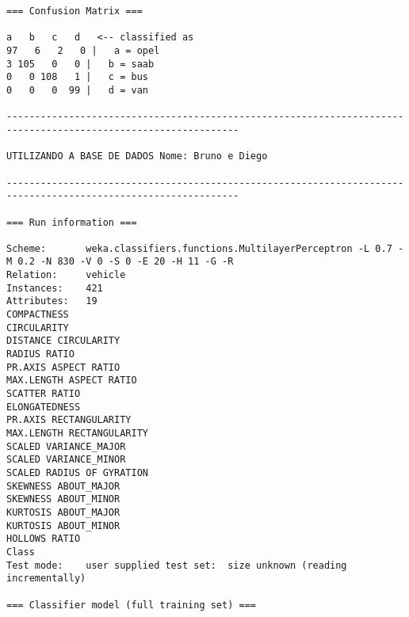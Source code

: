 \documentclass[
	article,			%
	11pt,				%
	oneside,			%
	a4paper,			%
	english,			%
	brazil,				%
	sumario=tradicional
	]{abntex2}
\begin{document}
\begin{lstlisting}
=== Confusion Matrix ===

a   b   c   d   <-- classified as
97   6   2   0 |   a = opel
3 105   0   0 |   b = saab
0   0 108   1 |   c = bus
0   0   0  99 |   d = van

---------------------------------------------------------------------------------------------------------------

UTILIZANDO A BASE DE DADOS Nome: Bruno e Diego

---------------------------------------------------------------------------------------------------------------

=== Run information ===

Scheme:       weka.classifiers.functions.MultilayerPerceptron -L 0.7 -M 0.2 -N 830 -V 0 -S 0 -E 20 -H 11 -G -R
Relation:     vehicle
Instances:    421
Attributes:   19
COMPACTNESS
CIRCULARITY
DISTANCE CIRCULARITY
RADIUS RATIO
PR.AXIS ASPECT RATIO
MAX.LENGTH ASPECT RATIO
SCATTER RATIO
ELONGATEDNESS
PR.AXIS RECTANGULARITY
MAX.LENGTH RECTANGULARITY
SCALED VARIANCE_MAJOR
SCALED VARIANCE_MINOR
SCALED RADIUS OF GYRATION
SKEWNESS ABOUT_MAJOR
SKEWNESS ABOUT_MINOR
KURTOSIS ABOUT_MAJOR
KURTOSIS ABOUT_MINOR
HOLLOWS RATIO
Class
Test mode:    user supplied test set:  size unknown (reading incrementally)

=== Classifier model (full training set) ===


\end{lstlisting}
\end{document}
